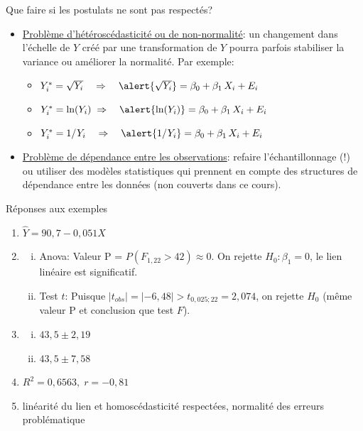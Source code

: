 \documentclass{BeamerTemplate}
\begin{document}
\begin{frame}[t]{Que faire si les postulats ne sont pas respectés?}

{\small
\begin{itemize}
\item \underline{Problème d'hétéroscédasticité ou de non-normalité}: un changement dans l'échelle de $Y$ créé par \alert{une transformation de $Y$} pourra parfois stabiliser la variance ou améliorer la normalité. Par exemple:
    \begin{itemize}\itemsep2mm
    \item $Y_i^*=\sqrt{Y_i}\quad\Rightarrow\quad \alert{\sqrt{Y_i}}=\beta_0+\beta_1\,X_i+E_i$
    \item $Y_i^*=\text{ln}(Y_i)\;\Rightarrow\quad \alert{\text{ln}(Y_i)}=\beta_0+\beta_1\,X_i+E_i$
    \item $Y_i^*=1/Y_i\quad\Rightarrow\quad \alert{1/Y_i}=\beta_0+\beta_1\,X_i+E_i$
    \end{itemize}
\item  \underline{Problème de dépendance entre les observations}: refaire l'échantillonnage (!) ou utiliser des modèles statistiques qui prennent en compte des structures de dépendance entre les données (non couverts dans ce cours).
\end{itemize}
}
\end{frame}


\begin{frame}[t]{Réponses aux exemples}

{\scriptsize

\begin{enumerate}\itemsep 1mm
  \item  $\hat Y = 90,7 - 0,051 X$
  \item {\scriptsize
\begin{enumerate}[(i)]\itemsep 1mm
        \item  Anova: Valeur P = $P(F_{1,22}>42)\approx 0$. On rejette $H_0:\beta_1=0$, le lien linéaire est significatif.
        \item Test $t$: Puisque $|t_{obs}|=|-6,48| > t_{0,025;22}=2,074$, on rejette $H_0$ (même valeur P et conclusion que test $F$).
        \end{enumerate}}
  \item \begin{enumerate}[(i)]\itemsep 1mm
        \item $ 43,5\pm 2,19$
        \item $ 43,5\pm 7,58$
        \end{enumerate}
  \item $R^2=0,6563,\; r=-0,81$
 \item linéarité du lien et homoscédasticité respectées, normalité des erreurs problématique
  \end{enumerate}

 }
\end{frame}
\end{document}
